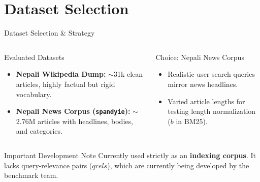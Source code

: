 \documentclass[aspectratio=169]{beamer}
\begin{document}
\section{Dataset Selection}
\begin{frame}{Dataset Selection \& Strategy}
  \begin{columns}
    \begin{block}{Evaluated Datasets}
      \begin{itemize}
        \item \textbf{Nepali Wikipedia Dump:} $\sim$31k clean articles, highly factual but rigid vocabulary.
        \item \textbf{Nepali News Corpus (\texttt{spandyie}):} $\sim$2.76M articles with headlines, bodies, and categories.
      \end{itemize}
    \end{block}
    
    \begin{block}{Choice: Nepali News Corpus}
      \begin{itemize}
        \item Realistic user search queries mirror news headlines.
        \item Varied article lengths for testing length normalization ($b$ in BM25).
      \end{itemize}
    \end{block}
  \end{columns}
  
  \vspace{0.4cm}
  \begin{alertblock}{Important Development Note}
    Currently used strictly as an \textbf{indexing corpus}. It lacks query-relevance pairs ($qrels$), which are currently being developed by the benchmark team.
  \end{alertblock}
\end{frame}
\end{document}
